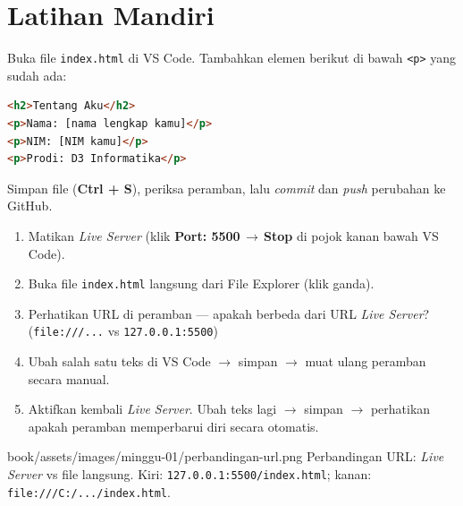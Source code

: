 \section{Latihan Mandiri}
\label{sec:m01-latihan}

\begin{latihan}
Buka file \texttt{index.html} di VS Code. Tambahkan elemen berikut di bawah \texttt{<p>} yang sudah ada:
\begin{lstlisting}[language=HTML]
<h2>Tentang Aku</h2>
<p>Nama: [nama lengkap kamu]</p>
<p>NIM: [NIM kamu]</p>
<p>Prodi: D3 Informatika</p>
\end{lstlisting}
Simpan file (\textbf{Ctrl + S}), periksa peramban, lalu \emph{commit} dan \emph{push} perubahan ke GitHub.
\end{latihan}

\begin{latihan}
\begin{enumerate}
  \item Matikan \emph{Live Server} (klik \textbf{Port: 5500\,$\rightarrow$\,Stop} di pojok kanan bawah VS Code).
  \item Buka file \texttt{index.html} langsung dari File Explorer (klik ganda).
  \item Perhatikan URL di peramban --- apakah berbeda dari URL \emph{Live Server}? (\texttt{file:///...} vs \texttt{127.0.0.1:5500})
  \item Ubah salah satu teks di VS Code $\rightarrow$ simpan $\rightarrow$ muat ulang peramban secara manual.
  \item Aktifkan kembali \emph{Live Server}. Ubah teks lagi $\rightarrow$ simpan $\rightarrow$ perhatikan apakah peramban memperbarui diri secara otomatis.
\end{enumerate}
\end{latihan}

\begin{tangkapanlayar}
  {book/assets/images/minggu-01/perbandingan-url.png}
  {Perbandingan URL: \emph{Live Server} vs file langsung.}
  {Kiri: \texttt{127.0.0.1:5500/index.html}; kanan: \texttt{file:///C:/.../index.html}.}
\end{tangkapanlayar}


